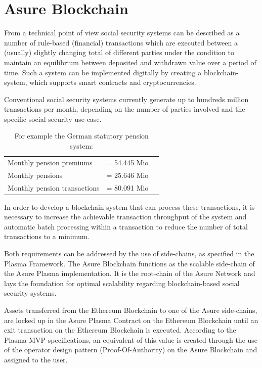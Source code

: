 \section{Asure Blockchain}
From a technical point of view social security systems can be described as a number of rule-based (financial) transactions which are executed between a (usually) slightly changing total of different parties under the condition to maintain an equilibrium between deposited and withdrawn value over a period of time. Such a system can be implemented digitally by creating a blockchain-system, which supports smart contracts and cryptocurrencies.

Conventional social security systems currently generate up to hundreds million transactions per month, depending on the number of parties involved and the specific social security use-case. 

\begin{table}[H]
\centering
\begin{tabular}{lp{}l}
  Monthly pension premiums & = 54.445 Mio\\
  Monthly pensions & = 25.646 Mio\\\hline
  Monthly pension transactions & = 80.091 Mio
\end{tabular}
\caption{\label{tab:table-name} For example the German statutory pension system: \cite{eckzahlen}}
\end{table}

In order to develop a blockchain system that can process these transactions, it is necessary to increase the achievable transaction throughput of the system and automatic batch processing within a transaction to reduce the number of total transactions to a minimum.

Both requirements can be addressed by the use of side-chains, as specified in the Plasma Framework. The Asure Blockchain functions as the scalable side-chain of the Asure Plasma implementation. It is the root-chain of the Asure Network and lays the foundation for optimal scalability regarding blockchain-based social security systems. 

Assets transferred from the Ethereum Blockchain to one of the Asure side-chains, are locked up in the Asure Plasma Contract on the Ethereum Blockchain until an exit transaction on the Ethereum Blockchain is executed. According to the Plasma MVP specifications, an equivalent of this value is created through the use of the operator design pattern (Proof-Of-Authority) on the Asure Blockchain and assigned to the user.

